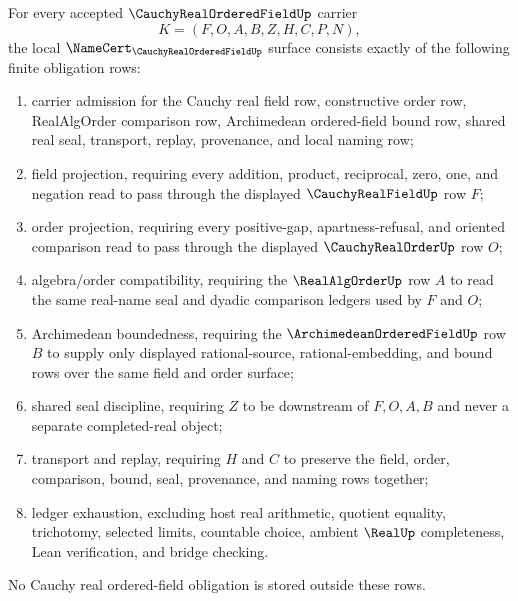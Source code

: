 \begin{theorem}
\label{thm:cauchy-real-ordered-field-namecert-obligations}
For every accepted $\CauchyRealOrderedFieldUp$ carrier
$$
K=(F,O,A,B,Z,H,C,P,N),
$$
the local $\NameCert_{\CauchyRealOrderedFieldUp}$ surface consists exactly of the following finite obligation rows:
\begin{enumerate}
\item carrier admission for the Cauchy real field row, constructive order row, RealAlgOrder comparison row, Archimedean ordered-field bound row, shared real seal, transport, replay, provenance, and local naming row;
\item field projection, requiring every addition, product, reciprocal, zero, one, and negation read to pass through the displayed $\CauchyRealFieldUp$ row $F$;
\item order projection, requiring every positive-gap, apartness-refusal, and oriented comparison read to pass through the displayed $\CauchyRealOrderUp$ row $O$;
\item algebra/order compatibility, requiring the $\RealAlgOrderUp$ row $A$ to read the same real-name seal and dyadic comparison ledgers used by $F$ and $O$;
\item Archimedean boundedness, requiring the $\ArchimedeanOrderedFieldUp$ row $B$ to supply only displayed rational-source, rational-embedding, and bound rows over the same field and order surface;
\item shared seal discipline, requiring $Z$ to be downstream of $F,O,A,B$ and never a separate completed-real object;
\item transport and replay, requiring $H$ and $C$ to preserve the field, order, comparison, bound, seal, provenance, and naming rows together;
\item ledger exhaustion, excluding host real arithmetic, quotient equality, trichotomy, selected limits, countable choice, ambient $\RealUp$ completeness, Lean verification, and bridge checking.
\end{enumerate}
No Cauchy real ordered-field obligation is stored outside these rows.
\end{theorem}
